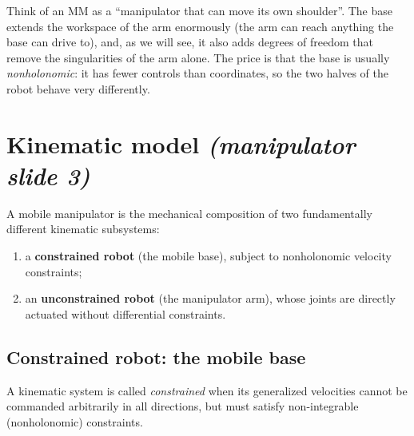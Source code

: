 \documentclass[11pt,a4paper]{article}
\theoremstyle{plain}
\theoremstyle{definition}
\theoremstyle{remark}
\begin{document}
\begin{intuition}
Think of an MM as a ``manipulator that can move its own shoulder''. The base extends the workspace of the arm enormously (the arm can reach anything the base can drive to), and, as we will see, it also adds degrees of freedom that remove the singularities of the arm alone. The price is that the base is usually \emph{nonholonomic}: it has fewer controls than coordinates, so the two halves of the robot behave very differently.
\end{intuition}

\section{Kinematic model \emph{(manipulator slide 3)}}

A mobile manipulator is the mechanical composition of two fundamentally different kinematic subsystems:
\begin{enumerate}[leftmargin=*,nosep]
\item a \textbf{constrained robot} (the mobile base), subject to nonholonomic velocity constraints;
\item an \textbf{unconstrained robot} (the manipulator arm), whose joints are directly actuated without differential constraints.
\end{enumerate}

\subsection*{Constrained robot: the mobile base}

A kinematic system is called \emph{constrained} when its generalized velocities cannot be commanded arbitrarily in all directions, but must satisfy non-integrable (nonholonomic) constraints.
\end{document}
